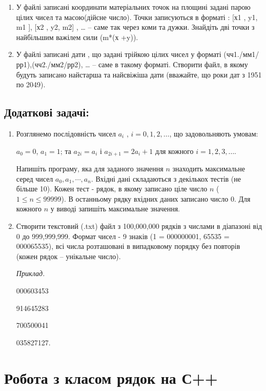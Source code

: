 \documentclass[a5paper,titlepage,openany,twoside,draft]{book_unv}%
\begin{document}
\begin{enumerate}
\item 
У файлі записані координати матеріальних точок на площині задані
парою цілих чисел та масою(дійсне число). Точки записуються в форматі :
{[}х1 , y1, m1 {]}, {[}х2 , y2, m2{]} , \ldots{}  -- саме так
через коми та дужки. Знайдіть дві точки з найбільшим важілем сили (m*(х
+y)).

\item 
У файлі записані дати , що задані трійкою цілих чисел у форматі
(чч1./мм1/рр1),(чч2./мм2/рр2), \ldots{} -- саме в такому форматі.
Створити файл, в якому будуть записано найстарша та найсвіжіша дати
(вважайте, що роки дат з 1951 по 2049).
\end{enumerate}


\section{Додаткові задачі:}
\begin{enumerate}
\def\labelenumi{\arabic{enumi})}
\setcounter{enumi}{21}

\item  Розглянемо послідовність чисел \(a_{i}\) , $i = 0, 1, 2, \ldots$, що
задовольняють умовам:

\(a_{0} = 0\), \(a_{1} = 1\); та \(a_{2i} = a_{i}\) і
\(a_{2i + 1} = {2a}_{i} + 1\) для кожного $i = 1, 2, 3, \ldots{} $.

Напишіть програму, яка для заданого значення $n$ знаходить максимальне
серед чисел \(a_{0},a_{1},\cdots,a_{n}\). Вхідні дані складаються з
декількох тестів (не більше 10). Кожен тест - рядок, в якому записано
ціле число $n$ ($1 \le n \le 99 999$). В останньому рядку вхідних даних записано
число 0. Для кожного $n$ у виводі запишіть максимальне значення.

\item
Створити текстовий (.txt) файл з 100,000,000 рядків з числами
в діапазоні від 0 до 999,999,999. Формат чисел - 9 знаків 
(1 = 000000001, 65535 = 000065535), всі числа розташовані в випадковому порядку без
повторів (кожен рядок -- унікальне число).

\emph{Приклад.}

000603453
 
914645283 

700500041 

035827127. 

\end{enumerate}


\chapter{Робота з класом рядок на С++}
%
\end{document}
